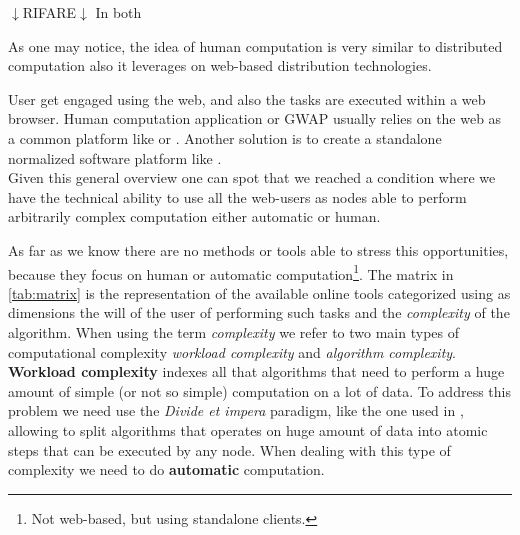 {\Huge$\downarrow$RIFARE$\downarrow$}
In both





As one may notice, the idea of human computation is very similar to distributed
computation also it leverages on web-based distribution technologies. 


User get
engaged using the web, and also the tasks are executed within a web browser.
Human computation application or \ac{GWAP} usually relies on the web as a common
platform like \cite{von2006peekaboom} or . Another solution is to
create a standalone normalized software platform like .\\

Given this general overview one can spot that we reached a condition where we have
the technical ability to use all the web-users as nodes able to perform arbitrarily
complex computation either automatic or human.




As far as we know there are no methods or tools able to stress this opportunities,
because they focus on human or automatic computation\footnote{Not web-based, but
using standalone clients.}. The matrix in \autoref{tab:matrix} is the representation
of the available online tools categorized using as dimensions the will of the user
of performing such tasks and the \emph{complexity} of the algorithm.
When using the term \emph{complexity} we refer to two main types of computational
complexity \emph{workload complexity} and \emph{algorithm complexity}.\\

\textbf{Workload complexity} indexes all that algorithms that need to perform a
huge amount of simple (or not so simple) computation on a lot of data. To address
this problem we need use the \emph{Divide et impera} paradigm, like the one used
in \cite{dean2008mapreduce}, allowing to split algorithms that operates on huge
amount of data into atomic steps that can be executed by any node. When dealing
with this type of complexity we need to do \textbf{automatic} computation.

